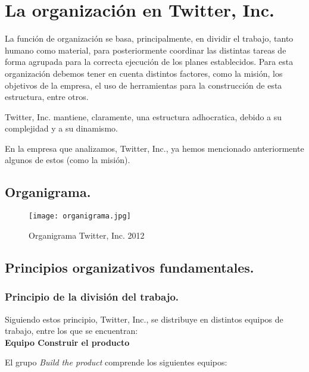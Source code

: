 

\section{La organización en Twitter, Inc.}

La función de organización se basa, principalmente, en dividir el trabajo, tanto humano como material, para posteriormente coordinar las distintas tareas de forma agrupada para la correcta ejecución de los planes establecidos. Para esta organización debemos tener en cuenta distintos factores, como la misión, los objetivos de la empresa, el uso de herramientas para la construcción de esta estructura, entre otros.

Twitter, Inc. mantiene, claramente, una estructura adhocratica, debido a su complejidad y a su dinamismo.

En la empresa que analizamos, Twitter, Inc., ya hemos mencionado anteriormente algunos de estos (como la misión).

\newpage

\subsection{Organigrama.}

\begin{figure}[!htb]
\centering
\texttt{[image: organigrama.jpg]}
\caption{\label{fig:frog}Organigrama Twitter, Inc. 2012}
\end{figure}


\subsection{Principios organizativos fundamentales.}

\subsubsection{Principio de la división del trabajo.}

Siguiendo estos principio, Twitter, Inc., se distribuye en distintos equipos de trabajo, entre los que se encuentran:\\

\textbf{Equipo Construir el producto}

El grupo \textit{Build the product} comprende los siguientes equipos:


